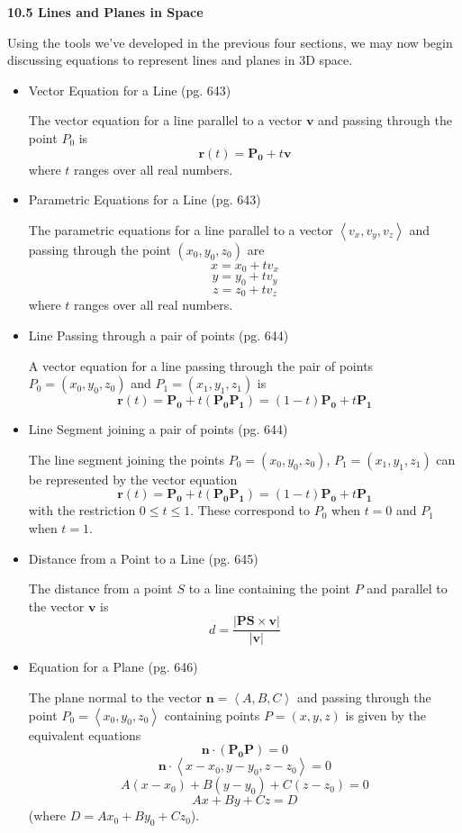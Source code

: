 \documentclass[12pt]{article}
\theoremstyle{plain}
\theoremstyle{definition}
\theoremstyle{remark}
\newcommand{\vect}[1]{\mathbf{#1}}
\begin{document}
\newpage

\centerline{\bf 10.5 Lines and Planes in Space}
	
	Using the tools we've developed in the previous four sections, we may now begin discussing equations to represent lines and planes in 3D space.
	
		\begin{itemize}
		\item Vector Equation for a Line (pg. 643)
		
		The vector equation for a line parallel to a vector $\vect{v}$ and passing through the point $P_0$ is \[\vect{r}(t) = \vect{P_0} + t\vect{v}\] where $t$ ranges over all real numbers.
		
		\item Parametric Equations for a Line (pg. 643)
		
		The parametric equations for a line parallel to a vector $\left<v_x,v_y,v_z\right>$ and passing through the point $(x_0,y_0,z_0)$ are \[x = x_0 + tv_x\] \[y = y_0 + tv_y\] \[z = z_0 + tv_z\] where $t$ ranges over all real numbers.
		
		\item Line Passing through a pair of points (pg. 644)
		
		A vector equation for a line passing through the pair of points $P_0=(x_0,y_0,z_0)$ and $P_1 =(x_1,y_1,z_1)$ is \[\vect{r}(t) = \vect{P_0} + t(\vect{P_0P_1})=(1-t)\vect{P_0}+t\vect{P_1}\]
		
		\item Line Segment joining a pair of points (pg. 644)
		
		The line segment joining the points $P_0=(x_0,y_0,z_0)$, $P_1=(x_1,y_1,z_1)$ can be represented by the vector equation \[\vect{r}(t) = \vect{P_0} + t(\vect{P_0P_1})=(1-t)\vect{P_0}+t\vect{P_1}\] with the restriction $0 \leq t \leq 1$. These correspond to $P_0$ when $t=0$ and $P_1$ when $t=1$.
		
		\item Distance from a Point to a Line (pg. 645)
		
		The distance from a point $S$ to a line containing the point $P$ and parallel to the vector $\vect{v}$ is \[d = \frac{|\vect{PS} \times \vect{v}|}{|\vect{v}|}\]
		
		\item Equation for a Plane (pg. 646)
		
		The plane normal to the vector $\vect{n} = \left<A,B,C\right>$ and passing through the point $P_0 = \left<x_0,y_0,z_0\right>$ containing points $P=(x,y,z)$ is given by the equivalent equations \[\vect{n} \cdot (\vect{P_0}\vect{P}) = 0\] \[\vect{n} \cdot \left<x-x_0,y-y_0,z-z_0\right>=0\] \[A(x-x_0) + B(y-y_0) + C(z-z_0) = 0\] \[Ax+By+Cz=D\] (where $D=Ax_0+By_0+Cz_0$).
		

\end{itemize}
\end{document}
